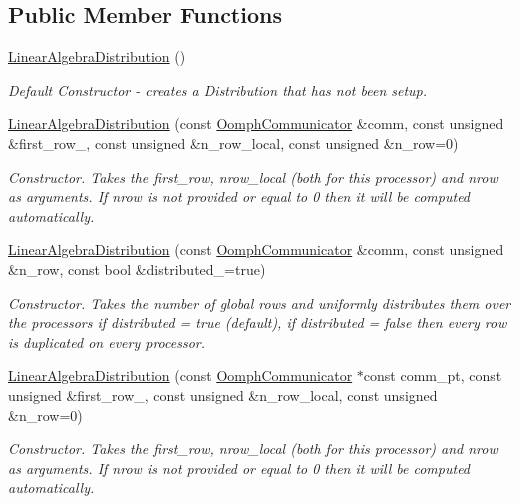 \subsection*{Public Member Functions}
\begin{DoxyCompactItemize}
\item 
\hyperlink{classoomph_1_1LinearAlgebraDistribution_ad1f6bbede398679d0e257abebae17951}{Linear\+Algebra\+Distribution} ()
\begin{DoxyCompactList}\small\item\em Default Constructor -\/ creates a Distribution that has not been setup. \end{DoxyCompactList}\item 
\hyperlink{classoomph_1_1LinearAlgebraDistribution_ae8714449bcd3d63c7bb7ebe7e6e01c7a}{Linear\+Algebra\+Distribution} (const \hyperlink{classoomph_1_1OomphCommunicator}{Oomph\+Communicator} \&comm, const unsigned \&first\+\_\+row\+\_\+, const unsigned \&n\+\_\+row\+\_\+local, const unsigned \&n\+\_\+row=0)
\begin{DoxyCompactList}\small\item\em Constructor. Takes the first\+\_\+row, nrow\+\_\+local (both for this processor) and nrow as arguments. If nrow is not provided or equal to 0 then it will be computed automatically. \end{DoxyCompactList}\item 
\hyperlink{classoomph_1_1LinearAlgebraDistribution_a65474439fb8537b2236f933c9225142a}{Linear\+Algebra\+Distribution} (const \hyperlink{classoomph_1_1OomphCommunicator}{Oomph\+Communicator} \&comm, const unsigned \&n\+\_\+row, const bool \&distributed\+\_\+=true)
\begin{DoxyCompactList}\small\item\em Constructor. Takes the number of global rows and uniformly distributes them over the processors if distributed = true (default), if distributed = false then every row is duplicated on every processor. \end{DoxyCompactList}\item 
\hyperlink{classoomph_1_1LinearAlgebraDistribution_a1fcec07ae49b0cb9799dcc87cc0d9ffe}{Linear\+Algebra\+Distribution} (const \hyperlink{classoomph_1_1OomphCommunicator}{Oomph\+Communicator} $\ast$const comm\+\_\+pt, const unsigned \&first\+\_\+row\+\_\+, const unsigned \&n\+\_\+row\+\_\+local, const unsigned \&n\+\_\+row=0)
\begin{DoxyCompactList}\small\item\em Constructor. Takes the first\+\_\+row, nrow\+\_\+local (both for this processor) and nrow as arguments. If nrow is not provided or equal to 0 then it will be computed automatically. \end{DoxyCompactList}\item 

\end{DoxyCompactItemize}
